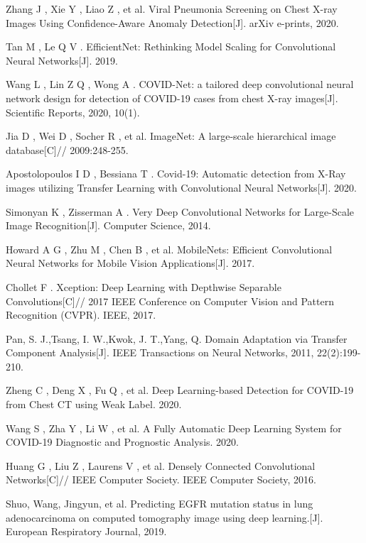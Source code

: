\documentclass[journal,twoside,web]{ieeecolor}
\begin{document}
\begin{thebibliography}{00}
     Zhang J ,  Xie Y ,  Liao Z , et al. Viral Pneumonia Screening on Chest X-ray Images Using Confidence-Aware Anomaly Detection[J]. arXiv e-prints, 2020.
    
     Tan M ,  Le Q V . EfficientNet: Rethinking Model Scaling for Convolutional Neural Networks[J].  2019.
    
     Wang L ,  Lin Z Q ,  Wong A . COVID-Net: a tailored deep convolutional neural network design for detection of COVID-19 cases from chest X-ray images[J]. Scientific Reports, 2020, 10(1).
    
     Jia D ,  Wei D ,  Socher R , et al. ImageNet: A large-scale hierarchical image database[C]// 2009:248-255.
    
     Apostolopoulos I D ,  Bessiana T . Covid-19: Automatic detection from X-Ray images utilizing Transfer Learning with Convolutional Neural Networks[J].  2020.
    
     Simonyan K ,  Zisserman A . Very Deep Convolutional Networks for Large-Scale Image Recognition[J]. Computer Science, 2014.
    
     Howard A G ,  Zhu M ,  Chen B , et al. MobileNets: Efficient Convolutional Neural Networks for Mobile Vision Applications[J].  2017.
    
     Chollet F . Xception: Deep Learning with Depthwise Separable Convolutions[C]// 2017 IEEE Conference on Computer Vision and Pattern Recognition (CVPR). IEEE, 2017.
    
    Pan, S. J.,Tsang, I. W.,Kwok, J. T.,Yang, Q. Domain Adaptation via Transfer Component Analysis[J]. IEEE Transactions on Neural Networks, 2011, 22(2):199-210.
    
     Zheng C ,  Deng X ,  Fu Q , et al. Deep Learning-based Detection for COVID-19 from Chest CT using Weak Label.  2020.
    
     Wang S ,  Zha Y ,  Li W , et al. A Fully Automatic Deep Learning System for COVID-19 Diagnostic and Prognostic Analysis.  2020.
    
     Huang G ,  Liu Z ,  Laurens V , et al. Densely Connected Convolutional Networks[C]// IEEE Computer Society. IEEE Computer Society, 2016.
    
    Shuo, Wang, Jingyun, et al. Predicting EGFR mutation status in lung adenocarcinoma on computed tomography image using deep learning.[J]. European Respiratory Journal, 2019.
    

\end{thebibliography}
\end{document}
